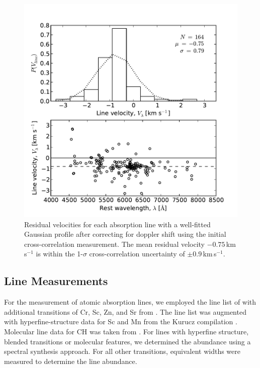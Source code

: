 \documentclass{emulateapj}
\begin{document}
\begin{figure}[h]
	\includegraphics[width=\columnwidth]{./figures/line-velocity.pdf}
	\caption{Residual velocities for each absorption line with a well-fitted Gaussian profile after correcting for doppler shift using the initial cross-correlation measurement. The mean residual velocity $-0.75$\,km\,s$^{-1}$ is within the 1-$\sigma$ cross-correlation uncertainty of $\pm0.9$\,km\,s$^{-1}$.}
	\label{fig:line-velocities}
\end{figure}


\subsection{Line Measurements}
\label{sec:line-measurements}

For the measurement of atomic absorption lines, we employed the line list of \citet{yong;et-al_2005} with additional transitions of Cr, Sc, Zn, and Sr from \citet{frebel;et-al_2010}. The line list was augmented with hyperfine-structure data for Sc and Mn from the Kurucz compilation \citet{kurucz;1998}. Molecular line data for CH was taken from \citet{plez;et-al_2008,plez;et-al_2009}. For lines with hyperfine structure, blended transitions or molecular features, we determined the abundance using a spectral synthesis approach. For all other transitions, equivalent widths were measured to determine the line abundance.
\end{document}
